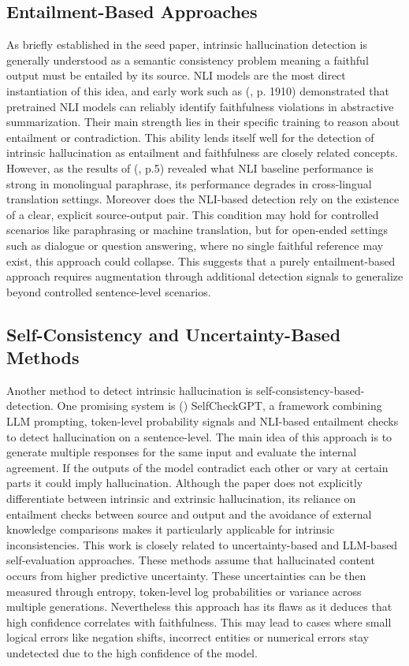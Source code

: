\documentclass[
  seminar,   	 
  english,   	 
  titlepage=on,
  captions=tableheadings
]{ttlab-qualify}
\begin{document}
\subsection{Entailment-Based Approaches}

As briefly established in the seed paper, intrinsic hallucination detection is generally understood as a semantic consistency problem meaning a faithful output must be entailed by its source. NLI models are the most direct instantiation of this idea, and early work such as (\cite{Maynez2020FaithfulnessFactuality}, p. 1910) demonstrated that pretrained NLI models can reliably identify faithfulness violations in abstractive summarization. Their main strength lies in their specific training to reason about entailment or contradiction. This ability lends itself well for the detection of intrinsic hallucination as entailment and faithfulness are closely related concepts.
However, as the results of (\cite{Gogoulou2025LLMHallucinationDetection}, p.5) revealed what NLI baseline performance is strong in monolingual paraphrase, its performance degrades in cross-lingual translation settings. Moreover does the NLI-based detection rely on the existence of a clear, explicit source-output pair. This condition may hold for controlled scenarios like paraphrasing or machine translation, but for open-ended settings such as dialogue or question answering, where no single faithful reference may exist, this approach could collapse. This suggests that a purely entailment-based approach requires augmentation through additional detection signals to generalize beyond controlled sentence-level scenarios.

\subsection{Self-Consistency and Uncertainty-Based Methods} 
\label{self-consistency}
Another method to detect intrinsic hallucination is self-consistency-based-detection. One promising system is (\cite{Manakul2023SelfCheckGPT}) SelfCheckGPT, a framework combining LLM prompting, token-level probability signals and NLI-based entailment checks to detect hallucination on a sentence-level. The main idea of this approach is to generate multiple responses for the same input and evaluate the internal agreement. If the outputs of the model contradict each other or vary at certain parts it could imply hallucination. Although the paper does not explicitly differentiate between intrinsic and extrinsic hallucination, its reliance on entailment checks between source and output and the avoidance of external knowledge comparisons makes it particularly applicable for intrinsic inconsistencies. This work is closely related to uncertainty-based and LLM-based self-evaluation approaches. These methods assume that hallucinated content occurs from higher predictive uncertainty. These uncertainties can be then measured through entropy, token-level log probabilities or variance across multiple generations. Nevertheless this approach has its flaws as it deduces that high confidence correlates with faithfulness. This may lead to cases where small logical errors like negation shifts, incorrect entities or numerical errors stay undetected due to the high confidence of the model.
\end{document}
